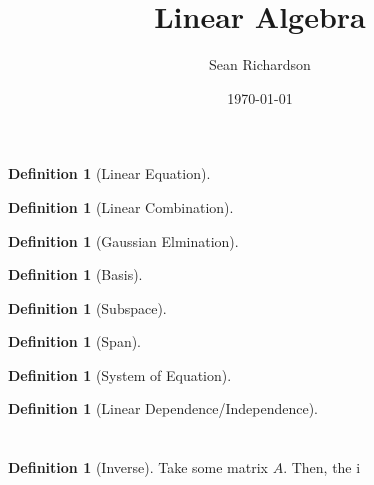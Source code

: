 \documentclass[11pt]{article}
\theoremstyle{definition}
\newtheorem{definition}[theorem]{Definition}
\begin{document}
\title{Linear Algebra}
\author{Sean Richardson}
\date{\today}
\maketitle

\section{}
\begin{definition}[Linear Equation]

\end{definition}
\begin{definition}[Linear Combination]

\end{definition}
\begin{definition}[Gaussian Elmination]

\end{definition}
\begin{definition}[Basis]

\end{definition}
\begin{definition}[Subspace]

\end{definition}
\begin{definition}[Span]

\end{definition}
\begin{definition}[System of Equation]

\end{definition}
\begin{definition}[Linear Dependence/Independence]

\end{definition}

\section{}
\begin{definition}[Inverse]
    Take some matrix $A$. Then, the i
\end{definition}
\end{document}
